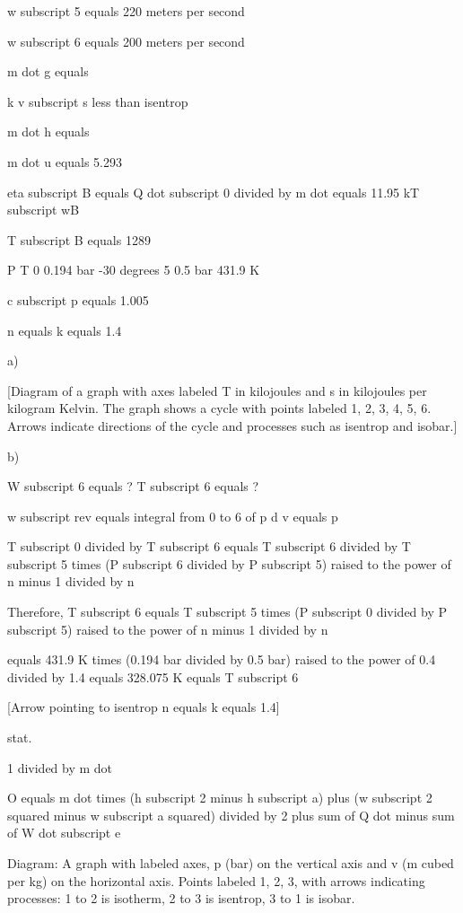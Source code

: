 w subscript 5 equals 220 meters per second

w subscript 6 equals 200 meters per second

m dot g equals

k v subscript s less than isentrop

m dot h equals

m dot u equals 5.293

eta subscript B equals Q dot subscript 0 divided by m dot equals 11.95 kT subscript wB

T subscript B equals 1289

P  T
0  0.194 bar  -30 degrees
5  0.5 bar  431.9 K

c subscript p equals 1.005

n equals k equals 1.4

a)

[Diagram of a graph with axes labeled T in kilojoules and s in kilojoules per kilogram Kelvin. The graph shows a cycle with points labeled 1, 2, 3, 4, 5, 6. Arrows indicate directions of the cycle and processes such as isentrop and isobar.]

b)

W subscript 6 equals ? T subscript 6 equals ?

w subscript rev equals integral from 0 to 6 of p d v equals p

T subscript 0 divided by T subscript 6 equals T subscript 6 divided by T subscript 5 times (P subscript 6 divided by P subscript 5) raised to the power of n minus 1 divided by n

Therefore, T subscript 6 equals T subscript 5 times (P subscript 0 divided by P subscript 5) raised to the power of n minus 1 divided by n

equals 431.9 K times (0.194 bar divided by 0.5 bar) raised to the power of 0.4 divided by 1.4 equals 328.075 K equals T subscript 6

[Arrow pointing to isentrop n equals k equals 1.4]

stat.

1 divided by m dot

O equals m dot times (h subscript 2 minus h subscript a) plus (w subscript 2 squared minus w subscript a squared) divided by 2 plus sum of Q dot minus sum of W dot subscript e

Diagram:  
A graph with labeled axes, p (bar) on the vertical axis and v (m cubed per kg) on the horizontal axis.  
Points labeled 1, 2, 3, with arrows indicating processes:  
1 to 2 is isotherm,  
2 to 3 is isentrop,  
3 to 1 is isobar.